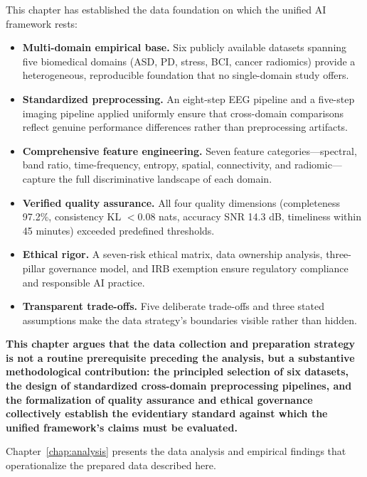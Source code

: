 This chapter has established the data foundation on which the unified AI framework rests:

\begin{itemize}
    \item \textbf{Multi-domain empirical base.} Six publicly available datasets spanning five biomedical domains (ASD, PD, stress, BCI, cancer radiomics) provide a heterogeneous, reproducible foundation that no single-domain study offers.
    \item \textbf{Standardized preprocessing.} An eight-step EEG pipeline and a five-step imaging pipeline applied uniformly ensure that cross-domain comparisons reflect genuine performance differences rather than preprocessing artifacts.
    \item \textbf{Comprehensive feature engineering.} Seven feature categories---spectral, band ratio, time-frequency, entropy, spatial, connectivity, and radiomic---capture the full discriminative landscape of each domain.
    \item \textbf{Verified quality assurance.} All four quality dimensions (completeness 97.2\%, consistency KL $<$0.08 nats, accuracy SNR 14.3 dB, timeliness within 45 minutes) exceeded predefined thresholds.
    \item \textbf{Ethical rigor.} A seven-risk ethical matrix, data ownership analysis, three-pillar governance model, and IRB exemption ensure regulatory compliance and responsible AI practice.
    \item \textbf{Transparent trade-offs.} Five deliberate trade-offs and three stated assumptions make the data strategy's boundaries visible rather than hidden.
\end{itemize}

\textbf{This chapter argues that the data collection and preparation strategy is not a routine prerequisite preceding the analysis, but a substantive methodological contribution: the principled selection of six datasets, the design of standardized cross-domain preprocessing pipelines, and the formalization of quality assurance and ethical governance collectively establish the evidentiary standard against which the unified framework's claims must be evaluated.}

Chapter~\ref{chap:analysis} presents the data analysis and empirical findings that operationalize the prepared data described here.

